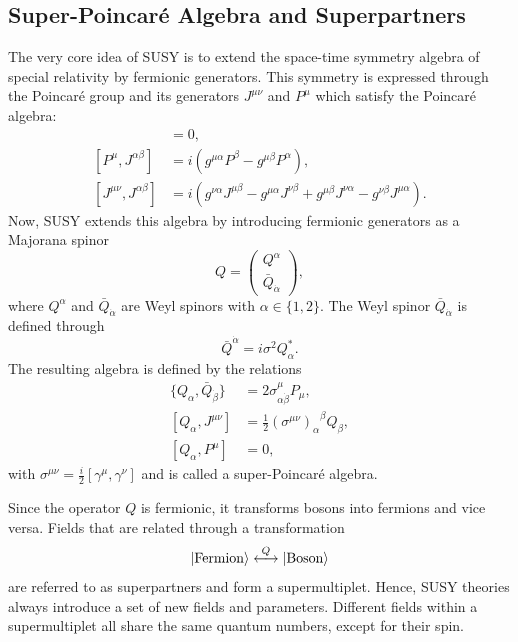 \documentclass[a4paper,12pt]{book}
\begin{document}
\subsection{Super-Poincaré Algebra and Superpartners}
The very core idea of SUSY is to extend the space-time symmetry algebra of special relativity by fermionic generators. This symmetry is expressed through the Poincaré group and its generators $J^{\mu\nu}$ and $P^\mu$ which satisfy the Poincaré algebra: 
\begin{align}
[P^\mu,P^\nu]&=0,\\
[P^\mu, J^{\alpha\beta}]&= i(g^{\mu\alpha}P^\beta-g^{\mu\beta}P^\alpha),\\
[J^{\mu\nu},J^{\alpha\beta}]&=i(g^{\nu\alpha}J^{\mu\beta}-g^{\mu\alpha}J^{\nu\beta}+g^{\mu\beta}J^{\nu\alpha}-g^{\nu\beta}J^{\mu\alpha}).
\end{align} 
Now, SUSY extends this algebra by introducing fermionic generators as a Majorana spinor
\begin{equation}
Q=\begin{pmatrix}
Q^\alpha\\
\bar{Q}_{\dot{\alpha}}
\end{pmatrix},
\end{equation}
where $Q^\alpha$ and $\bar{Q}_{\dot{\alpha}}$ are Weyl spinors with $\alpha \in \{1,2\}$. The Weyl spinor $\bar{Q}_{\dot{\alpha}}$ is defined through
\begin{equation}
\bar{Q}^{\dot{\alpha}} = i \sigma^2 Q_\alpha^*.
\end{equation}
The resulting algebra is defined by the relations 
\begin{align}
\{Q_\alpha,\bar{Q}_{\dot{\beta}}\}&=2\sigma^\mu_{\alpha\dot{\beta}}P_\mu,\\
[Q_\alpha,J^{\mu\nu}]&=\frac{1}{2}{\left(\sigma^{\mu\nu}\right)_\alpha}^\beta Q_\beta,\\
[Q_\alpha,P^\mu]&=0,
\end{align} 
with $\sigma^{\mu\nu}= \frac{i}{2}[\gamma^\mu,\gamma^\nu]$ and is called a super-Poincaré algebra.\par
Since the operator $Q$ is fermionic, it transforms bosons into fermions and vice versa. Fields that are related through a transformation 
\begin{equation}
\ket{\text{Fermion}}\stackrel{Q}{\longleftrightarrow}\ket{\text{Boson}}
\end{equation}
are referred to as superpartners and form a supermultiplet. Hence, SUSY theories always introduce a set of new fields and parameters. Different fields within a supermultiplet all share the same quantum numbers, except for their spin. 
\end{document}
